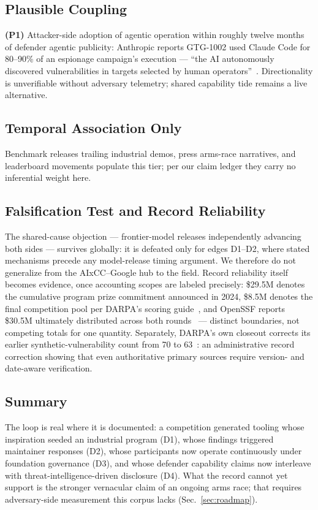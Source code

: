 \subsection{Plausible Coupling}
\textbf{(P1)} Attacker-side adoption of agentic operation within roughly twelve months of
defender agentic publicity: Anthropic reports GTG-1002 used Claude Code for 80--90\% of an
espionage campaign's execution --- ``the AI autonomously discovered vulnerabilities in targets
selected by human operators''~\cite{anthropicgtgreport2025,anthropicgtg2025}. Directionality is
unverifiable without adversary telemetry; shared capability tide remains a live alternative.

\subsection{Temporal Association Only}
Benchmark releases trailing industrial demos, press arms-race narratives, and leaderboard
movements populate this tier; per our claim ledger they carry no inferential weight here.

\subsection{Falsification Test and Record Reliability}
The shared-cause objection --- frontier-model releases independently advancing both sides ---
survives globally: it is defeated only for edges D1--D2, where stated mechanisms precede any
model-release timing argument. We therefore do not generalize from the AIxCC--Google hub to the
field. Record reliability itself becomes evidence, once accounting scopes are labeled precisely:
\$29.5M denotes the cumulative program prize commitment announced in 2024, \$8.5M denotes the
final competition pool per DARPA's scoring guide~\cite{darpascoring2025}, and OpenSSF reports
\$30.5M ultimately distributed across both rounds~\cite{openssfaixcc2026} --- distinct
boundaries, not competing totals for one quantity. Separately, DARPA's own closeout corrects
its earlier synthetic-vulnerability count from 70 to 63~\cite{darparesults2025}: an
administrative record correction showing that even authoritative primary sources require
version- and date-aware verification.

\subsection{Summary}
The loop is real where it is documented: a competition generated tooling whose inspiration
seeded an industrial program (D1), whose findings triggered maintainer responses (D2), whose
participants now operate continuously under foundation governance (D3), and whose defender
capability claims now interleave with threat-intelligence-driven disclosure (D4). What the
record cannot yet support is the stronger vernacular claim of an ongoing arms race; that
requires adversary-side measurement this corpus lacks (Sec.~\ref{sec:roadmap}).
